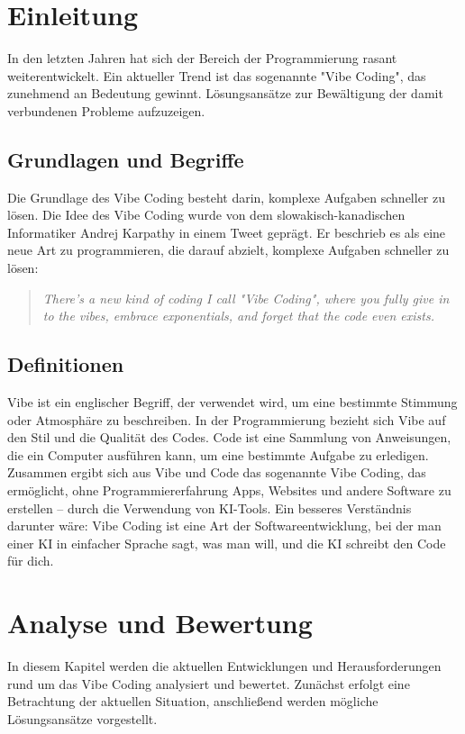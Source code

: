 \documentclass[paper=a4,fontsize=12pt,ngerman]{scrartcl}
\begin{document}
\clearpage
\tableofcontents
\thispagestyle{plain}

\clearpage
\section{Einleitung}
In den letzten Jahren hat sich der Bereich der Programmierung rasant weiterentwickelt.
Ein aktueller Trend ist das sogenannte "Vibe Coding", das zunehmend an Bedeutung gewinnt.
Lösungsansätze zur Bewältigung der damit verbundenen Probleme aufzuzeigen.

\subsection{Grundlagen und Begriffe}
Die Grundlage des Vibe Coding besteht darin, komplexe Aufgaben schneller zu lösen. Die Idee des Vibe Coding wurde von dem slowakisch-kanadischen Informatiker Andrej Karpathy in einem Tweet geprägt. 
Er beschrieb es als eine neue Art zu programmieren, die darauf abzielt, komplexe Aufgaben schneller zu lösen:
\begin{quote}
\textit{There's a new kind of coding I call "Vibe Coding", where you fully give in to the vibes, embrace exponentials, and forget that the code even exists.} 
\citep{TweetAndrejKarpathy}
\end{quote}



\subsection{Definitionen}
Vibe ist ein englischer Begriff, der verwendet wird, um eine bestimmte Stimmung oder Atmosphäre zu beschreiben.
In der Programmierung bezieht sich Vibe auf den Stil und die Qualität des Codes.
Code ist eine Sammlung von Anweisungen, die ein Computer ausführen kann, um eine bestimmte Aufgabe zu erledigen.
Zusammen ergibt sich aus Vibe und Code das sogenannte Vibe Coding, das ermöglicht,
ohne Programmiererfahrung Apps, Websites und andere Software zu erstellen – durch die Verwendung von KI-Tools. 
Ein besseres Verständnis darunter wäre:
Vibe Coding ist eine Art der Softwareentwicklung, bei der man einer KI in einfacher Sprache sagt, was man will, und die KI schreibt den Code für dich. \citep{Datacamp}

\clearpage
\section{Analyse und Bewertung}
In diesem Kapitel werden die aktuellen Entwicklungen und Herausforderungen rund um das Vibe Coding analysiert und bewertet. Zunächst erfolgt eine Betrachtung der aktuellen Situation, anschließend werden mögliche Lösungsansätze vorgestellt.
\end{document}
